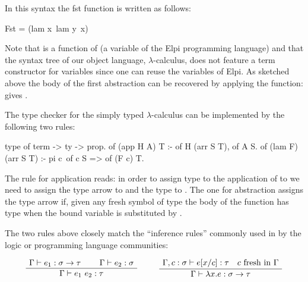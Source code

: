 \documentclass[a4paper, 11pt]{book}
\newenvironment{bprooftree}
  {\leavevmode\hbox\bgroup}
  {\DisplayProof\egroup}
\begin{document}
In this syntax the fst function is written as follows:

\begin{elpicode}
Fst = (lam x\ lam y\ x)
\end{elpicode}

Note that  is a function of  (a
variable of the Elpi programming language)
and that the syntax tree of our object language, $\lambda$-calculus, does not
feature a term constructor for variables since one can reuse the variables
of Elpi.
As sketched above the body of the first abstraction
can be recovered by applying the function: 
gives .



The type checker for the simply typed $\lambda$-calculus can be implemented by
the following two rules:

\begin{elpicode}
type of term -> ty -> prop.
of (app H A) T :- of H (arr S T), of A S.
of (lam F) (arr S T) :- pi c\ of c S => of (F c) T.
\end{elpicode}

The rule for application reads: in order to assign type  to
the application of  to  we need to assign
the type  arrow  to  and
the type  to . The one for abstraction
assigns the type  arrow  if, given any
fresh symbol  of type  the body of
the function  has type  when the bound variable
is substituted by .


The two rules above closely match the ``inference rules'' commonly used in
by the logic or programming language communities:
\label{inf:stlc}

$$
\begin{bprooftree}
  \AxiomC{$\Gamma \vdash e_1 : \sigma \to \tau$}
  \AxiomC{$\Gamma \vdash e_2 : \sigma$}
  \BinaryInfC{$\Gamma \vdash e_1~e_2 : \tau$}
\end{bprooftree}
\qquad
\begin{bprooftree}
  \AxiomC{$\Gamma, c : \sigma \vdash e[x/c] : \tau \quad c~\mathrm{fresh~in}~\Gamma$}
  \UnaryInfC{$\Gamma \vdash \lambda x.e : \sigma \to \tau$}
\end{bprooftree}
$$
\end{document}
